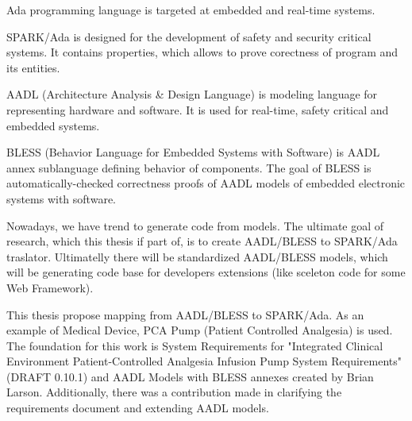 
\pagestyle{empty}
\setlength{\baselineskip}{0.8cm}




Ada programming language is targeted at embedded and real-time systems.

SPARK/Ada is designed for the development of safety and security critical systems. It contains properties, which allows to prove corectness of program and its entities.

AADL (Architecture Analysis \& Design Language) is modeling language for representing hardware and software. It is used for real-time, safety critical and embedded systems.

BLESS (Behavior Language for Embedded Systems with Software) is AADL annex sublanguage defining behavior of components. The goal of BLESS is automatically-checked correctness proofs of AADL models of embedded electronic systems with software.

Nowadays, we have trend to generate code from models. The ultimate goal of research, which this thesis if part of, is to create AADL/BLESS to SPARK/Ada traslator. Ultimatelly there will be standardized AADL/BLESS models, which will be generating code base for developers extensions (like sceleton code for some Web Framework).

This thesis propose mapping from AADL/BLESS to SPARK/Ada. As an example of Medical Device, PCA Pump (Patient Controlled Analgesia) is used. The foundation for this work is System Requirements for "Integrated Clinical Environment Patient-Controlled Analgesia Infusion Pump System Requirements" (DRAFT 0.10.1) \cite{PcaReq} and AADL Models with BLESS annexes created by Brian Larson. Additionally, there was a contribution made in clarifying the requirements document and extending AADL models.
